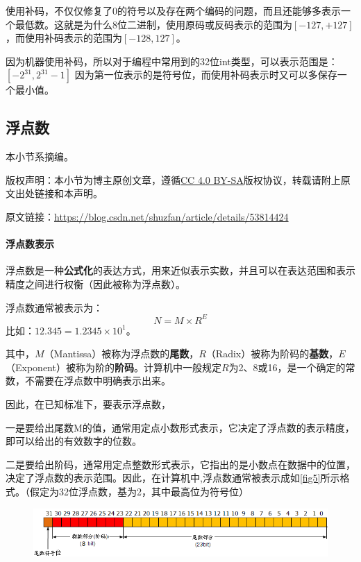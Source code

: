 使用补码，不仅仅修复了0的符号以及存在两个编码的问题，而且还能够多表示一个最低数。这就是为什么8位二进制，使用原码或反码表示的范围为$[-127,+127]$，而使用补码表示的范围为$[-128,127]$。

因为机器使用补码，所以对于编程中常用到的32位int类型，可以表示范围是：$[-2^{31},2^{31}-1]$ 因为第一位表示的是符号位，而使用补码表示时又可以多保存一个最小值。

\subsection{浮点数}
\begin{note}
本小节系摘编。

版权声明：本小节为博主原创文章，遵循\href{http://creativecommons.org/licenses/by-sa/4.0/}{CC 4.0 BY-SA}版权协议，转载请附上原文出处链接和本声明。

原文链接：\url{https://blog.csdn.net/shuzfan/article/details/53814424}
\end{note}

\paragraph*{浮点数表示}
浮点数是一种\textbf{公式化}的表达方式，用来近似表示实数，并且可以在表达范围和表示精度之间进行权衡（因此被称为浮点数）。

浮点数通常被表示为：
$$N=M\times R^E$$
比如：$12.345=1.2345\times 10^1$。

其中，$M$（Mantissa）被称为浮点数的\textbf{尾数}，$R$（Radix）被称为阶码的\textbf{基数}，$E$（Exponent）被称为阶的\textbf{阶码}。计算机中一般规定$R$为2、8或16，是一个确定的常数，不需要在浮点数中明确表示出来。

因此，在已知标准下，要表示浮点数，

一是要给出尾数M的值，通常用定点小数形式表示，它决定了浮点数的表示精度，即可以给出的有效数字的位数。

二是要给出阶码，通常用定点整数形式表示，它指出的是小数点在数据中的位置，决定了浮点数的表示范围。因此，在计算机中,浮点数通常被表示成如\autoref{fig5}所示格式。（假定为32位浮点数，基为2，其中最高位为符号位）

\begin{figure}[!ht]
\centering
\includegraphics[width=\textwidth]{images/358.png}
\caption{}\label{fig5}
\end{figure}

